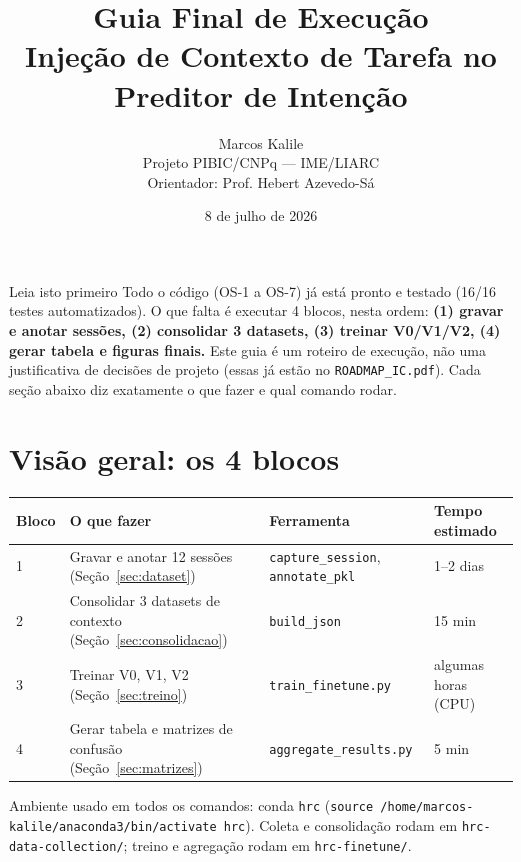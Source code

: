 \documentclass[11pt,a4paper]{article}
\title{\textbf{Guia Final de Execução} \\[0.2cm]
\large Injeção de Contexto de Tarefa no Preditor de Intenção}
\author{Marcos Kalile \\ \small Projeto PIBIC/CNPq --- IME/LIARC \\ \small Orientador: Prof. Hebert Azevedo-Sá}
\date{8 de julho de 2026}
\begin{document}
\maketitle

\begin{infobox}{Leia isto primeiro}
Todo o código (OS-1 a OS-7) já está pronto e testado (16/16 testes
automatizados). O que falta é executar 4 blocos, nesta ordem:
\textbf{(1) gravar e anotar sessões, (2) consolidar 3 datasets,
(3) treinar V0/V1/V2, (4) gerar tabela e figuras finais.}
Este guia é um roteiro de execução, não uma justificativa de decisões de
projeto (essas já estão no \texttt{ROADMAP\_IC.pdf}). Cada seção abaixo diz
exatamente o que fazer e qual comando rodar.
\end{infobox}

\tableofcontents
\newpage

\section{Visão geral: os 4 blocos}

\begin{center}
\begin{tabular}{@{}p{1cm}p{4.3cm}p{6cm}p{2.8cm}@{}}
\toprule
\textbf{Bloco} & \textbf{O que fazer} & \textbf{Ferramenta} & \textbf{Tempo estimado} \\
\midrule
1 & Gravar e anotar 12 sessões (Seção~\ref{sec:dataset}) & \texttt{capture\_session}, \texttt{annotate\_pkl} & 1--2 dias \\
2 & Consolidar 3 datasets de contexto (Seção~\ref{sec:consolidacao}) & \texttt{build\_json} & 15 min \\
3 & Treinar V0, V1, V2 (Seção~\ref{sec:treino}) & \texttt{train\_finetune.py} & algumas horas (CPU) \\
4 & Gerar tabela e matrizes de confusão (Seção~\ref{sec:matrizes}) & \texttt{aggregate\_results.py} & 5 min \\
\bottomrule
\end{tabular}
\end{center}

Ambiente usado em todos os comandos: conda \texttt{hrc}
(\texttt{source /home/marcos-kalile/anaconda3/bin/activate hrc}). Coleta e
consolidação rodam em \texttt{hrc-data-collection/}; treino e agregação
rodam em \texttt{hrc-finetune/}.

\end{document}
